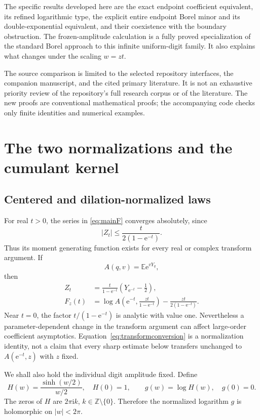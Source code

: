 \documentclass[11pt,a4paper]{article}
\numberwithin{equation}{section}
\theoremstyle{definition}
\theoremstyle{remark}
\newcommand{\E}{\mathbb E}
\newcommand{\ii}{\mathrm i}
\newcommand{\e}{\mathrm e}
\begin{document}
The specific results developed here are the exact endpoint coefficient equivalent, its refined logarithmic type, the explicit entire endpoint Borel minor and its double-exponential equivalent, and their coexistence with the boundary obstruction. The frozen-amplitude calculation is a fully proved specialization of the standard Borel approach to this infinite uniform-digit family. It also explains what changes under the scaling $w=zt$.

The source comparison is limited to the selected repository interfaces, the companion manuscript, and the cited primary literature. It is not an exhaustive priority review of the repository's full research corpus or of the literature. The new proofs are conventional mathematical proofs; the accompanying code checks only finite identities and numerical examples.

\section{The two normalizations and the cumulant kernel}
\label{sec:kernel}

\subsection{Centered and dilation-normalized laws}
For real $t>0$, the series in \eqref{eq:mainF} converges absolutely, since
\[
 |Z_t|\le\frac{t}{2(1-\e^{-t})}.
\]
Thus its moment generating function exists for every real or complex transform argument. If
\begin{equation}
 A(q,v)=\E\e^{vY_q},
\end{equation}
then
\begin{align}
 Z_t&=\frac{t}{1-\e^{-t}}\left(Y_{\e^{-t}}-\frac12\right),\label{eq:lawconversion}\\
 F_z(t)&=\log A\!\left(\e^{-t},\frac{zt}{1-\e^{-t}}\right)
       -\frac{zt}{2(1-\e^{-t})}.
 \label{eq:transformconversion}
\end{align}
Near $t=0$, the factor $t/(1-\e^{-t})$ is analytic with value one. Nevertheless a parameter-dependent change in the transform argument can affect large-order coefficient asymptotics. Equation~\eqref{eq:transformconversion} is a normalization identity, not a claim that every sharp estimate below transfers unchanged to $A(\e^{-t},z)$ with $z$ fixed.

We shall also hold the individual digit amplitude fixed. Define
\begin{equation}
 H(w)=\frac{\sinh(w/2)}{w/2},\quad H(0)=1,\qquad
 g(w)=\log H(w),\quad g(0)=0.
 \label{eq:H}
\end{equation}
The zeros of $H$ are $2\pi\ii k$, $k\in\mathbb Z\setminus\{0\}$. Therefore the normalized logarithm $g$ is holomorphic on $|w|<2\pi$.
\end{document}

